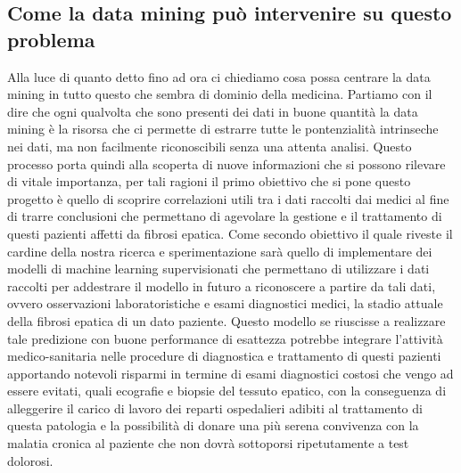 \documentclass[italian,12pt,a4paper]{article}
\begin{document}
	\subsection{Come la data mining può intervenire su questo problema}
    Alla luce di quanto detto fino ad ora ci chiediamo cosa possa centrare la data mining in tutto questo che sembra di dominio della medicina. Partiamo con il dire che ogni qualvolta che sono presenti dei dati in buone quantità la data mining è la risorsa che ci permette di estrarre tutte le pontenzialità intrinseche nei dati, ma non facilmente riconoscibili senza una attenta analisi. Questo processo porta quindi alla scoperta di nuove informazioni che si possono rilevare di vitale importanza, per tali ragioni il primo obiettivo che si pone questo progetto è quello di scoprire correlazioni utili tra i dati raccolti dai medici al fine di trarre conclusioni che permettano di agevolare la gestione e il trattamento di questi pazienti affetti da fibrosi epatica. Come secondo obiettivo il quale riveste il cardine della nostra ricerca e sperimentazione sarà quello di implementare dei modelli di machine learning supervisionati che permettano di utilizzare i dati raccolti per addestrare il modello in futuro a riconoscere a partire da tali dati, ovvero osservazioni laboratoristiche e esami diagnostici medici, la stadio attuale della fibrosi epatica di un dato paziente. Questo modello se riuscisse a realizzare tale predizione con buone performance di esattezza potrebbe integrare l'attività medico-sanitaria nelle procedure di diagnostica e trattamento di questi pazienti apportando notevoli risparmi in termine di esami diagnostici costosi che vengo ad essere evitati, quali ecografie e biopsie del tessuto epatico, con la conseguenza di alleggerire il carico di lavoro dei reparti ospedalieri adibiti al trattamento di questa patologia e la possibilità di donare una più serena convivenza con la malatia cronica al paziente che non dovrà sottoporsi ripetutamente a test dolorosi.
    \\
    
\end{document}
